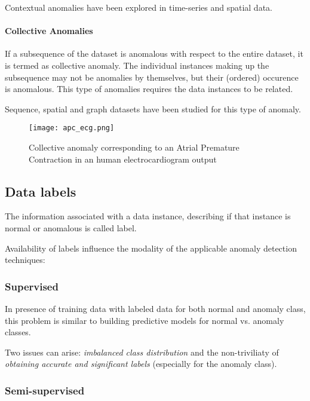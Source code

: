 Contextual anomalies have been explored in time-series and spatial data.

\paragraph{Collective Anomalies} If a subsequence of the dataset is anomalous with respect to the entire dataset, it is termed as collective anomaly. The individual instances making up the subsequence may not be anomalies by themselves, but their (ordered) occurence is anomalous. This type of anomalies requires the data instances to be related.

Sequence, spatial and graph datasets have been studied for this type of anomaly.

\begin{figure}
	\centerline{
		\texttt{[image: apc\_ecg.png]}}
	\caption{ Collective anomaly corresponding to an Atrial Premature Contraction in an human electrocardiogram output \cite{Goldberger2000PhysioBankPA} \cite{chandola2009anomaly}}
	\label{fig:apc_ecg}
\end{figure}


\subsection{Data labels}

The information associated with a data instance, describing if that instance is normal or anomalous is called label.

Availability of labels influence the modality of the applicable anomaly detection techniques:

\subsubsection{Supervised}

In presence of training data with labeled data for both normal and anomaly class, this problem is similar to building predictive models for normal vs. anomaly classes.

Two issues can arise: \textit{imbalanced class distribution} and the non-triviliaty of \textit{obtaining accurate and significant labels} (especially for the anomaly class).


\subsubsection{Semi-supervised}


